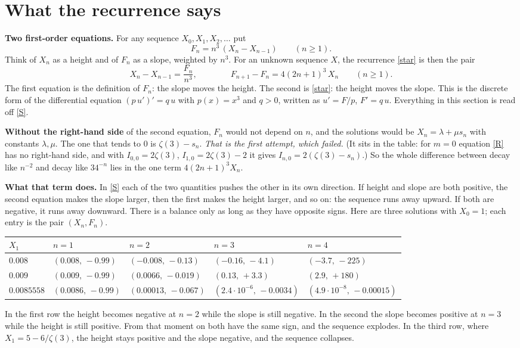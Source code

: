 \documentclass[11pt]{article}
\newcommand{\q}[1]{\medskip\noindent\textbf{#1}}
\begin{document}
\section{What the recurrence says}

\q{Two first-order equations.} For any sequence $X_0,X_1,X_2,\dots$ put
\[
F_n=n^3\,(X_n-X_{n-1})\qquad(n\ge1).
\]
Think of $X_n$ as a height and of $F_n$ as a slope, weighted by $n^3$. For an unknown sequence $X$,
the recurrence \eqref{star} is then the pair
\begin{equation}\label{S}
X_n-X_{n-1}=\frac{F_n}{n^3},\qquad\qquad F_{n+1}-F_n=4(2n+1)^3\,X_n\qquad(n\ge1).
\end{equation}
The first equation is the definition of $F_n$: the slope moves the height. The second is
\eqref{star}: the height moves the slope. This is the discrete form of the differential equation
$(p\,u')'=q\,u$ with $p(x)=x^3$ and $q>0$, written as $u'=F/p$, $F'=q\,u$. Everything in this
section is read off \eqref{S}.

\q{Without the right-hand side} of the second equation, $F_n$ would not depend on $n$, and the
solutions would be $X_n=\lambda+\mu s_n$ with constants $\lambda,\mu$. The one that tends to $0$ is
$\zeta(3)-s_n$. \emph{That is the first attempt, which failed.} (It sits in the table: for $m=0$
equation \eqref{R} has no right-hand side, and with $I_{0,0}=2\zeta(3)$, $I_{1,0}=2\zeta(3)-2$ it
gives $I_{n,0}=2(\zeta(3)-s_n)$.) So the whole difference between decay like $n^{-2}$ and decay
like $34^{-n}$ lies in the one term $4(2n+1)^3X_n$.

\q{What that term does.} In \eqref{S} each of the two quantities pushes the other in its own
direction. If height and slope are both positive, the second equation makes the slope larger, then
the first makes the height larger, and so on: the sequence runs away upward. If both are negative,
it runs away downward. There is a balance only as long as they have opposite signs. Here are three
solutions with $X_0=1$; each entry is the pair $(X_n,F_n)$.
\begin{center}
\begin{tabular}{@{}lllll@{}}
\toprule
$X_1$ & $n=1$ & $n=2$ & $n=3$ & $n=4$\\
\midrule
$0.008$ & $(0.008,\,-0.99)$ & $(-0.008,\,-0.13)$ & $(-0.16,\,-4.1)$ & $(-3.7,\,-225)$\\
$0.009$ & $(0.009,\,-0.99)$ & $(0.0066,\,-0.019)$ & $(0.13,\,+3.3)$ & $(2.9,\,+180)$\\
$0.0085558$ & $(0.0086,\,-0.99)$ & $(0.00013,\,-0.067)$ & $(2.4\cdot10^{-6},\,-0.0034)$ &
$(4.9\cdot10^{-8},\,-0.00015)$\\
\bottomrule
\end{tabular}
\end{center}
In the first row the height becomes negative at $n=2$ while the slope is still negative. In the
second the slope becomes positive at $n=3$ while the height is still positive. From that moment on
both have the same sign, and the sequence explodes. In the third row, where $X_1=5-6/\zeta(3)$, the
height stays positive and the slope negative, and the sequence collapses.
\end{document}
